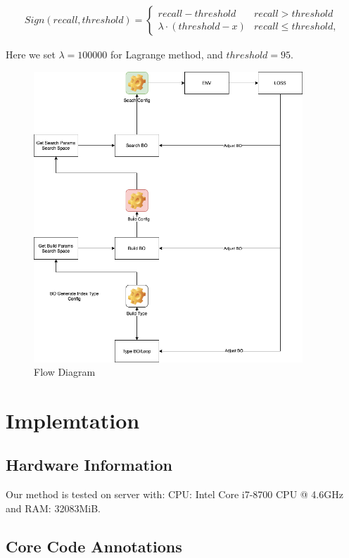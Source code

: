 \documentclass{ol-softwaremanual}
\begin{document}
\begin{align}
Sign(recall, threshold) = 
\begin{cases}  
recall - threshold & recall>threshold \\
\lambda \cdot (threshold - x) & recall\leq threshold,
\end{cases}
\end{align}

Here we set $\lambda = 100000$ for Lagrange method, and $threshold = 95$.

\newpage
\begin{figure}[!hpt]
    \centering
    \includegraphics[width=0.9\textwidth]{../figures/flow.png}
    \caption{\label{fig:flow}Flow Diagram}
\end{figure}

\section{Implemtation}
\subsection{Hardware Information}
Our method is tested on server with:
CPU: Intel Core i7-8700 CPU @ 4.6GHz and 
RAM: 32083MiB.

\subsection{Core Code Annotations}
\end{document}
